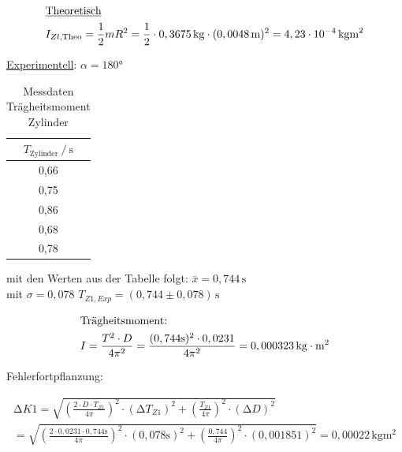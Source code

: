 \begin{align*}
     \intertext{\underline{Theoretisch}}  
     I_{Zl,\text{Theo}}= \frac{1}{2}mR^2 = \frac{1}{2} \cdot 0,3675\,\unit{\kilo\gram} \cdot (0,0048\,\unit{\meter})^2 = 4,23 \cdot 10^{-4}\,\unit{\kilo\gram\meter^2}   \\
\end{align*}


\begin{flushleft}
    \underline{Experimentell}: \quad
    $ \alpha = 180 \unit{\degree} $
\end{flushleft}


\begin{table}
    \centering
    \caption{Messdaten Trägheitsmoment Zylinder}
    \label{Tabelle3}
    \begin{tabular} {c}
        \toprule
        {$ T_{\text{Zylinder}} \mathbin{/} \unit{\second} $} \\
        \midrule
        0,66 \\
        0,75 \\
        0,86 \\
        0,68 \\
        0,78 \\
    \end{tabular} 
\end{table}

\begin{center}
   mit den Werten aus der Tabelle folgt: \quad $ \bar{x} = 0,744\, \unit{\second}$ \\
   mit $  \sigma = 0,078 $ \quad \to \quad $ T_{Z1,Exp} = (0,744 \pm 0,078)\, \unit{\second} $\\
\end{center}
\begin{align*}
   \intertext{Trägheitsmoment:} 
   I = \frac{T^2 \cdot D}{4\pi^2} = \frac{(0,744 \unit{\second})^2 \cdot 0,0231 }{4\pi^2} = 0,000323\, \unit{\kilo\gram} \cdot \unit{\meter^2}
\end{align*}

\newpage

\begin{flushleft}
    Fehlerfortpflanzung:
\end{flushleft}


\begin{align*}
    \increment K1 = \sqrt{ \left(\frac{2\cdot D\cdot T_{Z1}}{4\pi} \right)^2 \cdot (\increment T_{Z1})^2 + \left(\frac{T_{Z1}}{4\pi} \right)^2 \cdot (\increment D)^2} \\
    = \sqrt{ \left(\frac{2\cdot 0,0231 \cdot 0,744\unit{\second}}{4\pi} \right)^2 \cdot (0,078\unit{\second})^2 + \left(\frac{0,744}{4\pi} \right)^2 \cdot (0,001851)^2 } = 0,00022\,\unit{\kilo\gram\meter^2}  \\
\end{align*}


